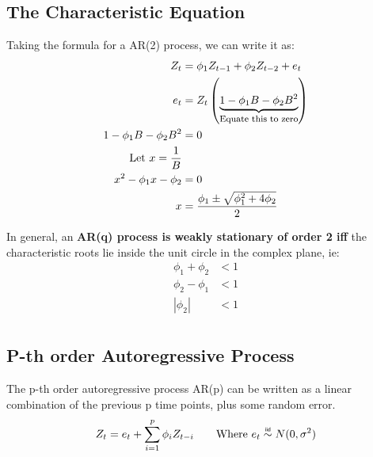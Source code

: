 \subsection{The Characteristic Equation}
Taking the formula for a AR(2) process, we can write it as:
\begin{equation*}
    \begin{aligned}
        Z_{t} &= \phi_{1}Z_{t-1} + \phi_{2}Z_{t-2} + e_t \\
        e_{t} &= Z_{t}\left( \explain{1 - \phi_{1}B - \phi_{2}B^{2}}{Equate
        this to zero} \right) \\
                1 - \phi_{1}B - \phi_{2}B^{2} &= 0 \\
                \text{Let $x = \frac{1}{B}$} &\\
                x^{2} - \phi_{1}x - \phi_{2} &= 0 \\
                x &= \frac{\phi_{1} \pm \sqrt{\phi^{2}_{1} + 4\phi_{2}}}{2}
    \end{aligned}
\end{equation*}

In general, an \textbf{AR(q) process is weakly stationary of order 2 iff} the
characteristic roots lie inside the unit circle in the complex plane, ie:
\begin{equation*}
    \begin{aligned}
        \phi_{1} + \phi_{2} &< 1 \\
        \phi_{2} - \phi_{1} &< 1 \\
        |\phi_{2}| &< 1 \\
    \end{aligned}
\end{equation*}

\subsection{P-th order Autoregressive Process}
The p-th order autoregressive process AR(p) can be written as a linear
combination of the previous p time points, plus some random error.
\begin{equation*}
    \begin{aligned}
        Z_{t} = e_{t} + \sum_{i=1}^{p} \phi_{i}Z_{t-i} \qquad \text{Where $e_t
        \iid N(0, \sigma^2)$}
    \end{aligned}
\end{equation*}

